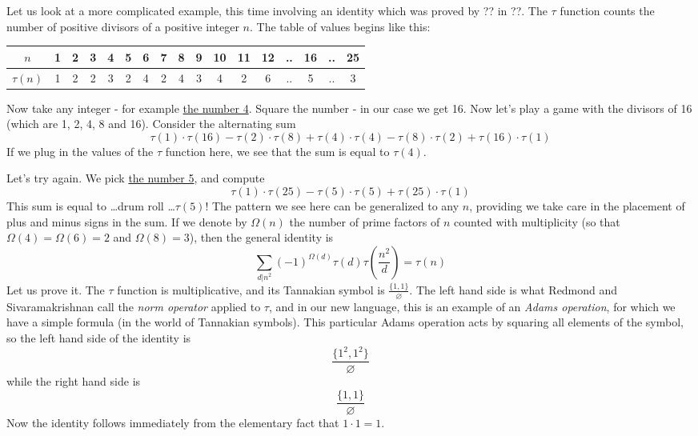 \begin{example}
Let us look at a more complicated example, this time involving an identity which was proved by ?? in ??. The $\tau$ function counts the number of positive divisors of a positive integer $n$. The table of values begins like this:

\vspace{6pt}
\begin{tabular}{  | c || c | c | c | c | c | c | c | c | c | c | c | c | c | c | c | c |  }
  \hline			
  $n$ & 1 & 2 & 3 & 4 & 5 & 6 & 7 & 8 & 9 & 10 & 11 & 12 & .. & 16 & .. & 25  \\
  \hline
  $\tau(n) $ & 1 & 2 & 2 & 3 & 2 & 4 & 2 & 4 & 3 & 4 & 2 & 6 & .. & 5 & .. & 3  \\
  \hline  
\end{tabular}
\vspace{6pt}

Now take any integer - for example \underline{the number 4}. Square the number - in our case we get 16. Now let's play a game with the divisors of 16 (which are 1, 2, 4, 8 and 16). Consider the alternating sum
$$    \tau(1) \cdot \tau(16) -  \tau(2) \cdot \tau(8) + \tau(4) \cdot \tau(4) - \tau(8) \cdot \tau(2) + \tau(16) \cdot \tau(1)  $$
If we plug in the values of the $\tau$ function here, we see that the sum is equal to $\tau(4)$.

Let's try again. We pick \underline{the number 5}, and compute
$$    \tau(1) \cdot \tau(25) -  \tau(5) \cdot \tau(5) + \tau(25) \cdot \tau(1) $$
This sum is equal to \ldots drum roll \ldots $\tau(5)$!
The pattern we see here can be generalized to any $n$, providing we take care in the placement of plus and minus signs in the sum. If we denote by $\Omega(n)$ the number of prime factors of $n$ counted with multiplicity (so that $\Omega(4) = \Omega(6) = 2$ and $\Omega(8) = 3$), then the general identity is
\begin{equation} \label{introexample2}
\sum_{d \vert n^2} (-1)^{\Omega(d)} \tau(d) \tau(\frac{n^2}{d}) = \tau(n)  
\end{equation}
Let us prove it. The $\tau$ function is multiplicative, and its Tannakian symbol is $\frac{ \{ 1 ,1 \} }{ \varnothing }$. The left hand side is what Redmond and Sivaramakrishnan \cite{} call the \emph{norm operator} applied to $\tau$, and in our new language, this is an example of an \emph{Adams operation}, for which we have a simple formula (in the world of Tannakian symbols). This particular Adams operation acts by squaring all elements of the symbol, so the left hand side of the identity is 
$$\frac{ \{ 1^2, 1^2  \} }{ \varnothing  }$$
while the right hand side is 
$$ \frac{ \{ 1, 1  \} }{ \varnothing  } $$
Now the identity follows immediately from the elementary fact that $1 \cdot 1 = 1$. 
\end{example}

